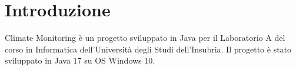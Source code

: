 \NoBgThispage
\section{Introduzione}

    Climate Monitoring è un progetto sviluppato in Java per il Laboratorio A del corso in Informatica dell’Università degli Studi dell’Insubria.
Il progetto è stato sviluppato in Java 17 su OS Windows 10. 

